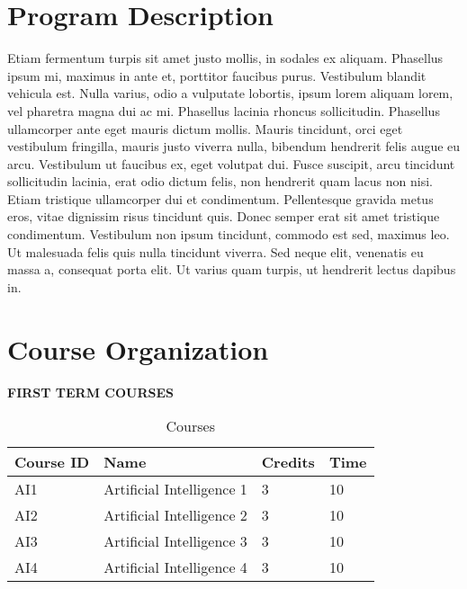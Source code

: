 \documentclass{article}
\begin{document}

\newpage
\tableofcontents
\newpage


\section{Program Description}

Etiam fermentum turpis sit amet justo mollis, in sodales ex aliquam. Phasellus ipsum mi, maximus in ante et, porttitor faucibus purus. Vestibulum blandit vehicula est. Nulla varius, odio a vulputate lobortis, ipsum lorem aliquam lorem, vel pharetra magna dui ac mi. Phasellus lacinia rhoncus sollicitudin. Phasellus ullamcorper ante eget mauris dictum mollis. Mauris tincidunt, orci eget vestibulum fringilla, mauris justo viverra nulla, bibendum hendrerit felis augue eu arcu. Vestibulum ut faucibus ex, eget volutpat dui. Fusce suscipit, arcu tincidunt sollicitudin lacinia, erat odio dictum felis, non hendrerit quam lacus non nisi. Etiam tristique ullamcorper dui et condimentum. Pellentesque gravida metus eros, vitae dignissim risus tincidunt quis. Donec semper erat sit amet tristique condimentum. Vestibulum non ipsum tincidunt, commodo est sed, maximus leo. Ut malesuada felis quis nulla tincidunt viverra. Sed neque elit, venenatis eu massa a, consequat porta elit. Ut varius quam turpis, ut hendrerit lectus dapibus in. 

\section{Course Organization}



\textbf{\large FIRST TERM COURSES}\\



\begin{table}[H]
    \caption{Courses}
    \label{tab:n}
    \centering
    \begin{tabularx}{\textwidth}{*{4}{X}}
      \toprule
      Course ID & Name & Credits & Time  \\ 
      \midrule
      AI1 & Artificial Intelligence 1    & 3        & 10         \\ 
      \midrule
      AI2 & Artificial Intelligence 2         & 3         & 10          \\ 
      \midrule
      AI3 & Artificial Intelligence 3         & 3        & 10        \\ 
      \midrule
      AI4 & Artificial Intelligence 4        & 3        & 10        \\
      \bottomrule
    \end{tabularx}
    \centering

\end{table}
\end{document}
